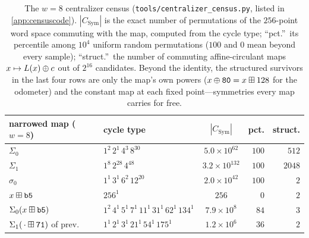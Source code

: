 \begin{table}[ht]
  \centering
  \small
  \begin{tabular}{@{}llcrr@{}}
    \toprule
    narrowed map ($w = 8$) & cycle type & $|C_{\mathrm{Sym}}|$ &
      pct. & struct. \\
    \midrule
    $\Sigma_0$ & $1^{2}\,2^{1}\,4^{3}\,8^{30}$
      & $5.0\times10^{62}$ & $100$ & $512$ \\
    $\Sigma_1$ & $1^{8}\,2^{28}\,4^{48}$
      & $3.2\times10^{132}$ & $100$ & $2048$ \\
    $\sigma_0$ & $1^{1}\,3^{1}\,6^{2}\,12^{20}$
      & $2.0\times10^{42}$ & $100$ & $2$ \\
    $x \boxplus \mathtt{b5}$ & $256^{1}$
      & $256$ & $0$ & $2$ \\
    $\Sigma_0(x \boxplus \mathtt{b5})$
      & $1^{2}\,4^{1}\,5^{1}\,7^{1}\,11^{1}\,31^{1}\,62^{1}\,134^{1}$
      & $7.9\times10^{8}$ & $84$ & $3$ \\
    $\Sigma_1(\,\cdot \boxplus \mathtt{71})$ of prev.
      & $1^{1}\,2^{1}\,3^{1}\,21^{1}\,54^{1}\,175^{1}$
      & $1.2\times10^{6}$ & $36$ & $2$ \\
    \bottomrule
  \end{tabular}
  \caption{The $w=8$ centralizer census
  (\texttt{tools/centralizer\_census.py}, listed in
  \cref{app:censuscode}). $|C_{\mathrm{Sym}}|$ is the
  exact number of permutations of the $256$-point word space commuting
  with the map, computed from the cycle type; ``pct.''\ its percentile
  among $10^{4}$ uniform random permutations ($100$ and $0$ mean beyond
  every sample); ``struct.''\ the number of commuting affine-circulant
  maps $x \mapsto L(x) \oplus c$ out of $2^{16}$ candidates. Beyond
  the identity, the structured survivors in the last four rows are only
  the map's own powers ($x \oplus \mathtt{80} = x \boxplus 128$ for
  the odometer) and the constant map at each fixed point---symmetries
  every map carries for free.}
  \label{tab:census}
\end{table}

